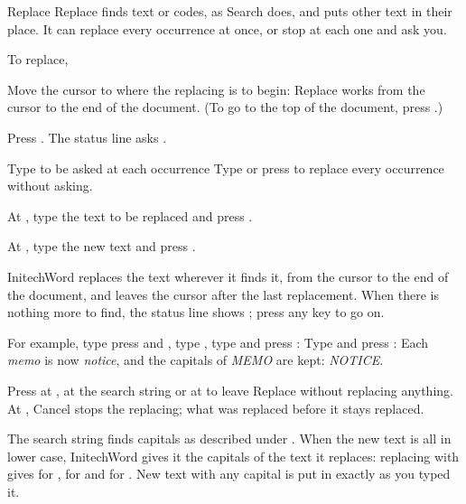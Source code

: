 \begin{Feature}{Replace}
Replace finds text or codes, as Search does, and puts other text in their
place.  It can replace every occurrence at once, or stop at each one and ask
you.

To replace,
\begin{WPSteps}
\item Move the cursor to where the replacing is to begin: Replace works from
the cursor to the end of the document.  (To go to the top of the document,
press .)
\item Press .  The status line asks
.
\item Type  to be asked at each occurrence
\Or
Type  or press  to replace every occurrence without
asking.
\item At , type the text to be replaced and press .
\item At , type the new text and press .
\end{WPSteps}
InitechWord replaces the text wherever it finds it, from the cursor to the
end of the document, and leaves the cursor after the last replacement.  When
there is nothing more to find, the status line shows ;
press any key to go on.

For example, type
press  and , type
, type  and press :
Type  and press :
Each \textit{memo} is now \textit{notice}, and the capitals of \textit{MEMO}
are kept: \textit{NOTICE}.
\EndReplay

\Notes
{}
Press  at , at the search string or
at  to leave Replace without replacing anything.  At
, Cancel stops the replacing; what was replaced
before it stays replaced.

The search string finds capitals as described under .  When
the new text is all in lower case, InitechWord gives it the capitals of the
text it replaces: replacing  with  gives
 for ,  for  and 
for .  New text with any capital is put in exactly as you typed
it.


\end{Feature}
